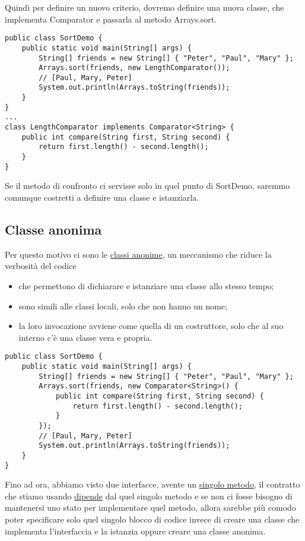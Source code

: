 Quindi per definire un nuovo criterio, dovremo definire una nuova classe, che implementa Comparator e passarla al metodo Arrays.sort.
\begin{lstlisting}
public class SortDemo {
    public static void main(String[] args) {
        String[] friends = new String[] { "Peter", "Paul", "Mary" };
        Arrays.sort(friends, new LengthComparator());
        // [Paul, Mary, Peter]
        System.out.println(Arrays.toString(friends));
    }
}
...
class LengthComparator implements Comparator<String> {
    public int compare(String first, String second) {
        return first.length() - second.length();
    }
}
\end{lstlisting}

Se il metodo di confronto ci servisse solo in quel punto di SortDemo, saremmo comunque costretti a definire una classe e istanziarla.

\subsection{Classe anonima}

Per questo motivo ci sono le \underline{classi anonime}, un meccanismo che riduce la verbosità del codice
\begin{itemize}
    \item che permettono di dichiarare e istanziare una classe allo stesso tempo;
    \item sono simili alle classi locali, solo che non hanno un nome;
    \item la loro invocazione avviene come quella di un costruttore, solo che al suo interno c'è una classe vera e propria.
\end{itemize}

\begin{lstlisting}
public class SortDemo {
    public static void main(String[] args) {
        String[] friends = new String[] { "Peter", "Paul", "Mary" };
        Arrays.sort(friends, new Comparator<String>() {
            public int compare(String first, String second) {
                return first.length() - second.length();
            }
        });
        // [Paul, Mary, Peter]
        System.out.println(Arrays.toString(friends));
    }
}
\end{lstlisting}

Fino ad ora, abbiamo visto due interfacce, avente un \underline{singolo metodo}, il contratto che stiamo usando \underline{dipende} dal quel singolo
metodo e se non ci fosse bisogno di mantenersi uno stato per implementare quel metodo, allora sarebbe più comodo poter specificare solo quel singolo blocco di codice 
invece di creare una classe che implementa l’interfaccia e la istanzia oppure creare una classe anonima.